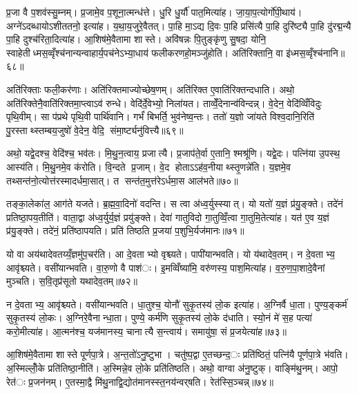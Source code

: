 प्र॒जा वै प॒शव॑स्सु॒म्नम्। प्र॒जामे॒व प॒शूना॒त्मन्ध॑त्ते। धु॒रि धु॒र्यौ॑ पात॒मित्या॑ह। जा॒या॒प॒त्योर्गो॑पी॒थाय॑। अग्ने॑ऽदब्धायोऽशीततनो॒ इत्या॑ह। य॒था॒य॒जुरे॒वैतत्। पा॒हि मा॒ऽद्य दि॒वः पा॒हि प्रसि॑त्यै पा॒हि दुरि॑ष्ट्यै पा॒हि दु॑रद्म॒न्यै पा॒हि दुश्च॑रिता॒दित्या॑ह। आ॒शिष॑मे॒वैतामा शास्ते। अवि॑षन्नः पि॒तुङ्कृ॑णु सु॒षदा॒ योनि॒ स्वाहेतीध्मस॒व्वृँश्च॑नान्यन्वाहार्य॒पच॑नेऽभ्या॒धाय॑ फलीकरणहो॒मञ्जु॑होति। अति॑रिक्तानि॒ वा इ॑ध्मस॒व्वृँश्च॑नानि॥६८॥

अति॑रिक्ताः फली॒कर॑णाः। अति॑रिक्तमाज्योच्छेष॒णम्। अति॑रिक्त ए॒वाति॑रिक्तन्दधाति। अथो॒ अति॑रिक्तेनै॒वाति॑रिक्तमा॒प्त्वाऽव॑ रुन्धे। वेदि॑र्दे॒वेभ्यो॒ निला॑यत। ताव्वेँ॒देनान्व॑विन्दन्न्। वे॒देन॒ वेदि॑व्विँविदुः पृथि॒वीम्। सा प॑प्रथे पृथि॒वी पार्थि॑वानि। गर्भं॑ बिभर्ति॒ भुव॑नेष्व॒न्तः। ततो॑ य॒ज्ञो जा॑यते विश्व॒दानि॒रिति॑ पु॒रस्ताथ्स्तम्बय॒जुषो॑ वे॒देन॒ वेदि॒ संमा॒र्ष्ट्यनु॑वित्त्यै॥६९॥

अथो॒ यद्वे॒दश्च॒ वेदि॑श्च॒ भव॑तः। मि॒थु॒न॒त्वाय॒ प्रजात्यै। प्र॒जाप॑ते॒र्वा ए॒तानि॒ श्मश्रू॑णि। यद्वे॒दः। पत्नि॑या उ॒पस्थ॒ आस्य॑ति। मि॒थु॒नमे॒व क॑रोति। वि॒न्दते प्र॒जाम्। वे॒द होताऽऽह॑व॒नीयाथ्स्तृ॒णन्ने॑ति। य॒ज्ञमे॒व तथ्सन्त॑नो॒त्योत्त॑रस्मादर्धमा॒सात्। त सन्त॑त॒मुत्त॑रेऽर्धमा॒स आल॑भते॥७०॥

तङ्का॒लेका॑ल॒ आग॑ते यजते। ब्र॒ह्म॒वा॒दिनो॑ वदन्ति। स त्वा अ॑ध्व॒र्युस्स्यात्। यो यतो॑ य॒ज्ञं प्र॑यु॒ङ्क्ते। तदे॑नं प्रतिष्ठा॒पय॒तीति॑। वाता॒द्वा अ॑ध्व॒र्युर्य॒ज्ञं प्रयु॑ङ्क्ते। देवा॑ गातुविदो गा॒तुव्विँ॒त्वा गा॒तुमि॒तेत्या॑ह। यत॑ ए॒व य॒ज्ञं प्र॑यु॒ङ्क्ते। तदे॑नं॒ प्रति॑ष्ठापयति। प्रति॑ तिष्ठति प्र॒जया॑ प॒शुभि॒र्यज॑मानः॥७१॥


यो वा अय॑थादेवतय्यँ॒ज्ञमु॑प॒चर॑ति। आ दे॒वताभ्यो वृश्च्यते। पापी॑यान्भवति। यो य॑थादेव॒तम्। न दे॒वताभ्य॒ आवृ॑श्च्यते। वसी॑यान्भवति। वा॒रु॒णो वै पाश॑ः। इ॒मव्विँष्या॑मि॒ वरु॑णस्य॒ पाश॒मित्या॑ह। व॒रु॒ण॒पा॒शादे॒वैनां मुञ्चति। स॒वि॒तृप्र॑सूतो यथादेव॒तम्॥७२॥

न दे॒वताभ्य॒ आवृ॑श्च्यते। वसी॑यान्भवति। धा॒तुश्च॒ योनौ॑ सुकृ॒तस्य॑ लो॒क इत्या॑ह। अ॒ग्निर्वै धा॒ता। पुण्य॒ङ्कर्म॑ सुकृ॒तस्य॑ लो॒कः। अ॒ग्निरे॒वैनान्धा॒ता। पुण्ये॒ कर्म॑णि सुकृ॒तस्य॑ लो॒के द॑धाति। स्यो॒नं मे॑ स॒ह पत्या॑ करो॒मीत्या॑ह। आ॒त्मन॑श्च॒ यज॑मानस्य॒ चानात्यै स॒न्त्वाय॑। समायु॑षा॒ सं प्र॒जयेत्या॑ह॥७३॥

आ॒शिष॑मे॒वैतामा शास्ते पूर्णपा॒त्रे। अ॒न्त॒तो॑ऽनु॒ष्टुभा। चतु॑ष्प॒द्वा ए॒तच्छन्द॒ः प्रति॑ष्ठितं॒ पत्नि॑यै पूर्णपा॒त्रे भ॑वति। अ॒स्मिल्लोँ॒के प्रति॑तिष्ठा॒नीति॑। अ॒स्मिन्ने॒व लो॒के प्रति॑तिष्ठति। अथो॒ वाग्वा अ॑नु॒ष्टुक्। वाङ्मि॑थु॒नम्। आपो॒ रेत॑ः प्र॒जन॑नम्। ए॒तस्मा॒द्वै मि॑थु॒नाद्वि॒द्योत॑मानस्स्त॒नय॑न्वर्‌षति। रेत॑स्सि॒ञ्चन्न्॥७४॥

